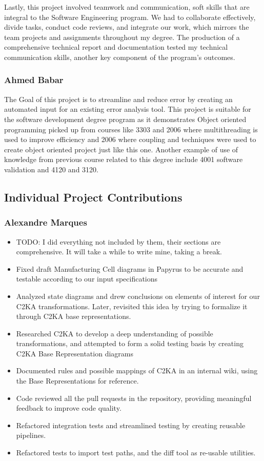 Lastly, this project involved teamwork and communication, soft skills that are integral to the Software Engineering program. We had to collaborate effectively, divide tasks, conduct code reviews, and integrate our work, which mirrors the team projects and assignments throughout my degree. The production of a comprehensive technical report and documentation tested my technical communication skills, another key component of the program’s outcomes.


\subsubsection{Ahmed Babar}\label{subsubsec:ahmed-deg}
The Goal of this project is to streamline and reduce error by creating an automated input for an existing error analysis tool. This project is suitable for the software development degree program as it demonstrates Object oriented programming picked up from courses like 3303 and 2006 where multithreading is used to improve efficiency and 2006 where coupling and techniques were used to create object oriented project just like this one. Another example of use of knowledge from previous course related to this degree include 4001 software validation and 4120 and 3120.

\subsection{Individual Project Contributions}\label{subsec:individual-project-contributions}
\subsubsection{Alexandre Marques}
\begin{itemize}
    \item TODO: I did everything not included by them, their sections are comprehensive.
    It will take a while to write mine, taking a break.
    \item Fixed draft Manufacturing Cell diagrams in Papyrus to be accurate and testable according to our input specifications
    \item Analyzed state diagrams and drew conclusions on elements of interest for our C2KA transformations.
    Later, revisited this idea by trying to formalize it through C2KA base representations.
    \item Researched C2KA to develop a deep understanding of possible transformations,
    and attempted to form a solid testing basis by creating C2KA Base Representation diagrams %
    \item Documented rules and possible mappings of C2KA in an internal wiki, using the Base Representations for reference. %
    \item Code reviewed all the pull requests in the repository, providing meaningful feedback to improve code quality.
    \item Refactored integration tests and streamlined testing by creating reusable pipelines.
    \item Refactored tests to import test paths, and the diff tool as re-usable utilities.
\end{itemize}

